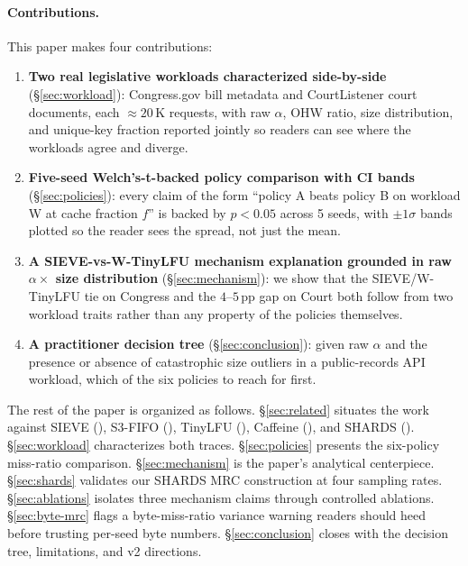 \paragraph{Contributions.} This paper makes four contributions:
\begin{enumerate}[leftmargin=*,itemsep=0pt,topsep=2pt]
  \item \textbf{Two real legislative workloads characterized side-by-side}
    (\S\ref{sec:workload}): Congress.gov bill metadata and CourtListener
    court documents, each $\approx 20$\,K requests, with raw $\alpha$,
    OHW ratio, size distribution, and unique-key fraction reported
    jointly so readers can see where the workloads agree and diverge.
  \item \textbf{Five-seed Welch's-t-backed policy comparison with CI
    bands} (\S\ref{sec:policies}): every claim of the form ``policy A
    beats policy B on workload W at cache fraction $f$'' is backed by
    $p < 0.05$ across 5 seeds, with $\pm 1\sigma$ bands plotted so the
    reader sees the spread, not just the mean.
  \item \textbf{A SIEVE-vs-W-TinyLFU mechanism explanation grounded in
    raw $\alpha \times$ size distribution} (\S\ref{sec:mechanism}): we
    show that the SIEVE/W-TinyLFU tie on Congress and the $4$--$5$\,pp
    gap on Court both follow from two workload traits rather than any
    property of the policies themselves.
  \item \textbf{A practitioner decision tree}
    (\S\ref{sec:conclusion}): given raw $\alpha$ and the presence or
    absence of catastrophic size outliers in a public-records API
    workload, which of the six policies to reach for first.
\end{enumerate}

The rest of the paper is organized as follows. \S\ref{sec:related}
situates the work against SIEVE (\cite{zhang2024sieve}), S3-FIFO
(\cite{yang2023fifo}), TinyLFU (\cite{einziger2017tinylfu}), Caffeine
(\cite{caffeine2024}), and SHARDS (\cite{waldspurger2015shards}).
\S\ref{sec:workload} characterizes both traces. \S\ref{sec:policies}
presents the six-policy miss-ratio comparison.
\S\ref{sec:mechanism} is the paper's analytical centerpiece.
\S\ref{sec:shards} validates our SHARDS MRC construction at four
sampling rates. \S\ref{sec:ablations} isolates three mechanism claims
through controlled ablations. \S\ref{sec:byte-mrc} flags a
byte-miss-ratio variance warning readers should heed before trusting
per-seed byte numbers. \S\ref{sec:conclusion} closes with the decision
tree, limitations, and v2 directions.
